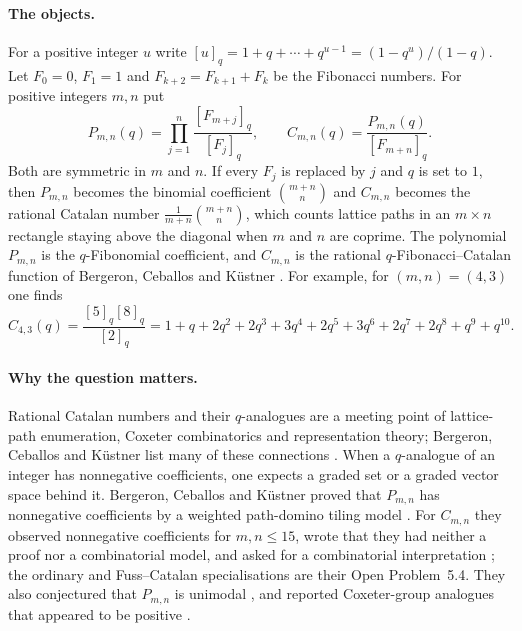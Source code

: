 \documentclass[11pt,a4paper]{article}
\theoremstyle{definition}\newtheorem{definition}[theorem]{Definition}
\theoremstyle{remark}\newtheorem{remark}[theorem]{Remark}\newtheorem{example}[theorem]{Example}
\numberwithin{equation}{section}
\begin{document}
\paragraph{The objects.}
For a positive integer $u$ write $[u]_q=1+q+\cdots+q^{u-1}=(1-q^u)/(1-q)$. Let $F_0=0$, $F_1=1$ and $F_{k+2}=F_{k+1}+F_k$ be the Fibonacci numbers. For positive integers $m,n$ put
\begin{equation}\label{eq:defs}
 P_{m,n}(q)=\prod_{j=1}^n\frac{[F_{m+j}]_q}{[F_j]_q},\qquad C_{m,n}(q)=\frac{P_{m,n}(q)}{[F_{m+n}]_q}.
\end{equation}
Both are symmetric in $m$ and $n$. If every $F_j$ is replaced by $j$ and $q$ is set to $1$, then $P_{m,n}$ becomes the binomial coefficient $\binom{m+n}{n}$ and $C_{m,n}$ becomes the rational Catalan number $\frac1{m+n}\binom{m+n}{n}$, which counts lattice paths in an $m\times n$ rectangle staying above the diagonal when $m$ and $n$ are coprime. The polynomial $P_{m,n}$ is the $q$-Fibonomial coefficient, and $C_{m,n}$ is the rational $q$-Fibonacci--Catalan function of Bergeron, Ceballos and K\"ustner \cite{bck}. For example, for $(m,n)=(4,3)$ one finds
\[
 C_{4,3}(q)=\frac{[5]_q[8]_q}{[2]_q}=1+q+2q^2+2q^3+3q^4+2q^5+3q^6+2q^7+2q^8+q^9+q^{10}.
\]

\paragraph{Why the question matters.}
Rational Catalan numbers and their $q$-analogues are a meeting point of lattice-path enumeration, Coxeter combinatorics and representation theory; Bergeron, Ceballos and K\"ustner list many of these connections \cite[\S4]{bck}. When a $q$-analogue of an integer has nonnegative coefficients, one expects a graded set or a graded vector space behind it. Bergeron, Ceballos and K\"ustner proved that $P_{m,n}$ has nonnegative coefficients by a weighted path-domino tiling model \cite[Thm.~2.4]{bck}. For $C_{m,n}$ they observed nonnegative coefficients for $m,n\le15$, wrote that they had neither a proof nor a combinatorial model, and asked for a combinatorial interpretation \cite[Open Problem~4.3]{bck}; the ordinary and Fuss--Catalan specialisations are their Open Problem~5.4. They also conjectured that $P_{m,n}$ is unimodal \cite[Conj.~2.5]{bck}, and reported Coxeter-group analogues that appeared to be positive \cite[Remark~4.5]{bck}.
\end{document}
